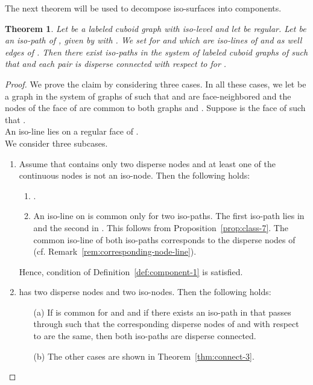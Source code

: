 \documentclass[a4paper,11pt]{article}
\newtheorem{theorem}{Theorem}[section]
\begin{document}
\noindent The next theorem will be used to decompose iso-surfaces into components.
\begin{theorem}Let  be a labeled cuboid graph with iso-level  and let
 be regular. Let  be an iso-path of , given by  with
. We set  for  and  which
are iso-lines of  and as well edges of . Then there exist iso-paths  in
the system of labeled cuboid graphs of  such that  and
each pair  is disperse connected with respect to  for .
\label{thm:iso-path-connectedness-disperse-paths}
\end{theorem}
\begin{proof}
We prove the claim by considering three cases. In all these cases, we let  be a
graph in the system of graphs of  such that  and  are face-neighbored and
the nodes of the face  of  are common to both graphs  and .
Suppose  is the face of  such that .\\

An iso-line  lies on a regular face 
of . \\

We consider three subcases.
\begin{enumerate}
\item Assume that  contains only two disperse nodes and at least one of the continuous nodes is not
an iso-node. Then the following holds:
\begin{enumerate}
\item .
\item An iso-line on  is common only for two iso-paths. The first iso-path lies in  and the second in
. This follows from Proposition~\ref{prop:class-7}. The common iso-line of both iso-paths corresponds to
the disperse nodes of  (cf. Remark~\ref{rem:corresponding-node-line}).
\end{enumerate}
Hence, condition  of Definition~\ref{def:component-1} is satisfied.

\item  has two disperse nodes and two iso-nodes. Then the following holds:
\begin{enumerate}
\item[(a)] If  is common for  and  and if there exists an iso-path  in  that passes
through  such that the corresponding disperse nodes of  and  with respect to  are
the same, then both iso-paths are disperse connected.

\item[(b)] The other cases are shown in Theorem~\ref{thm:connect-3}.
\end{enumerate}


\end{enumerate}
\end{proof}
\end{document}
